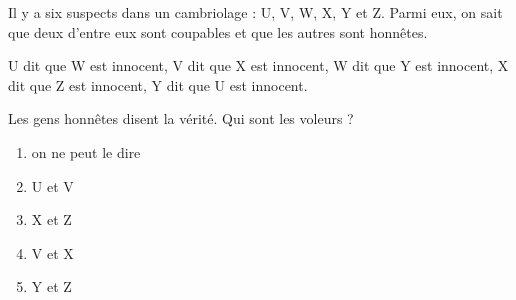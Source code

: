 Il y a six suspects dans un cambriolage : U, V, W, X, Y et Z. Parmi
eux, on sait que deux d'entre eux sont coupables et que les autres
sont honnêtes.
\par U dit que \og W est innocent\fg, V dit que \og X est innocent\fg,
W dit que \og Y est innocent\fg, X dit que \og Z est innocent\fg, Y
dit que \og U est innocent\fg.
\par Les gens honnêtes disent la vérité. Qui sont les voleurs ?
\begin{multicols}{5}
  \begin{enumerate}[A/]
  \item on ne peut le dire
  \item U et V
  \item X et Z
  \item V et X
  \item Y et Z
  \end{enumerate}
\end{multicols}